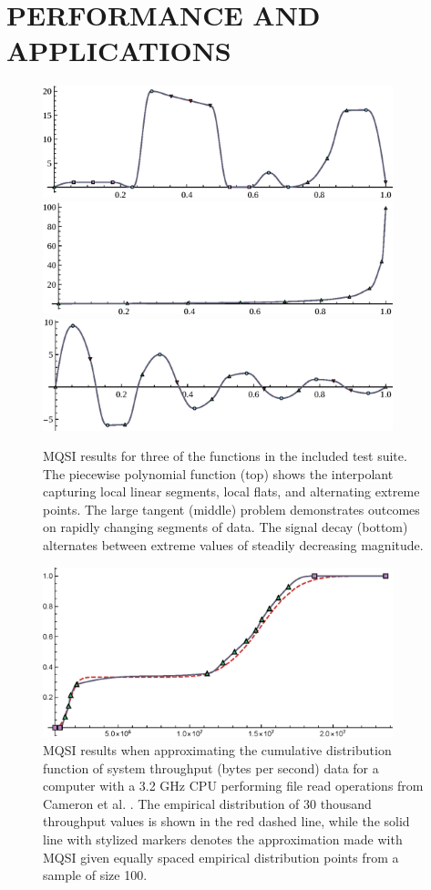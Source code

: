 \section{PERFORMANCE AND APPLICATIONS}

\begin{figure}[h]
  \centering
 \includegraphics[width=4in]{vis/2-piecewise-polynomial.eps}
 \includegraphics[width=4in]{vis/3-large-tangent.eps}
 \includegraphics[width=4in]{vis/4-signal-decay.eps}
\caption{ %
{\ttVIII MQSI} results for three of the functions in the included test
suite. The {\itVIII piecewise polynomial} function (top) shows the
interpolant capturing local linear segments, local flats, and
alternating extreme points. The {\itVIII large tangent} (middle)
problem demonstrates outcomes on rapidly changing segments of data.
The {\itVIII signal decay} (bottom) alternates between extreme values
of steadily decreasing magnitude.}
\end{figure}
\begin{figure}
  \centering
  \includegraphics[width=4in]{vis/5-real-data.eps}
\caption{ %
{\ttVIII MQSI} results when approximating the cumulative distribution
function of system throughput (bytes per second) data for a computer
with a 3.2 GHz CPU performing file read operations from Cameron et al.
\cite{cameron2019moana}. The empirical distribution of 30 thousand throughput values is
shown in the red dashed line, while the solid line with stylized
markers denotes the approximation made with {\ttVIII MQSI} given
equally spaced empirical distribution points from a sample of size 100.}
\end{figure}

